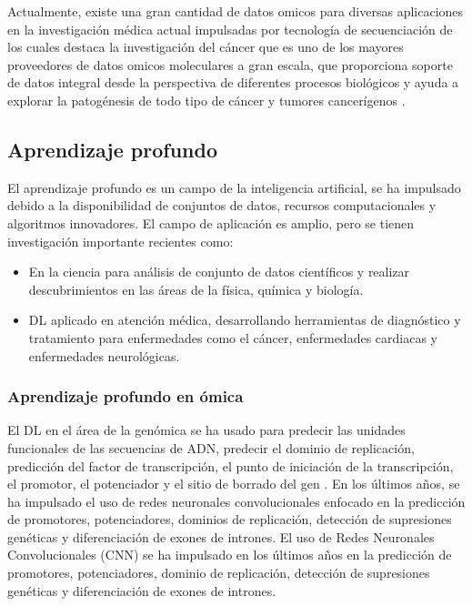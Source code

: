 Actualmente, existe una gran cantidad de datos omicos para diversas aplicaciones en la investigación médica actual impulsadas por tecnología de secuenciación de los cuales destaca la investigación del cáncer que es uno de los mayores proveedores de datos omicos moleculares a gran escala, que proporciona soporte de datos integral desde la perspectiva de diferentes procesos biológicos y ayuda a explorar la patogénesis de todo tipo de cáncer y tumores cancerígenos \citep{li2024avbae}.

\subsection{Aprendizaje profundo}

El aprendizaje profundo es un campo de la inteligencia artificial, se ha impulsado debido a la disponibilidad de conjuntos de datos, recursos computacionales y algoritmos innovadores. El campo de aplicación es amplio, pero se tienen investigación importante recientes como:

\begin{itemize}

   \addtolength{\itemsep}{-4mm} %
        \item En la ciencia para análisis de conjunto de datos científicos y realizar descubrimientos en las áreas de la física, química y biología.

        \item DL aplicado en atención médica, desarrollando herramientas de diagnóstico y tratamiento para enfermedades como el cáncer, enfermedades cardiacas y enfermedades neurológicas.

    \end{itemize}

\subsubsection{Aprendizaje profundo en ómica}

El DL en el área de la genómica se ha usado para predecir las unidades funcionales de las secuencias de ADN, predecir el dominio de replicación, predicción del factor de transcripción, el punto de iniciación de la transcripción, el promotor, el potenciador y el sitio de borrado del gen \citep{quang2019factornet,umarov2017recognition,zeng2016convolutional,zhang2017titer,min2017predicting,singh2019predicting,lee2015dna}. En los últimos años, se ha impulsado el uso de redes neuronales convolucionales enfocado en la predicción de promotores, potenciadores, dominios de replicación, detección de supresiones genéticas y diferenciación de exones de intrones. El uso de Redes Neuronales Convolucionales (CNN) se ha impulsado en los últimos años en la predicción de promotores, potenciadores, dominio de replicación, detección de supresiones genéticas y diferenciación de exones de intrones.

